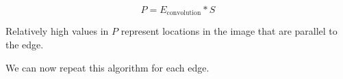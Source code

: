 \documentclass[11pt]{article}
\begin{document}
$$P = E_\text{convolution} * S$$

Relatively high values in $P$ represent locations in the image that are parallel to the edge.

We can now repeat this algorithm for each edge.


\end{document}
